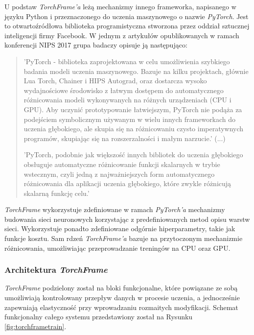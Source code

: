     U podstaw \textit{TorchFrame'a} leżą mechanizmy innego frameworka, napisanego w języku Python i
    przeznaczonego do uczenia maszynowego o nazwie \textit{PyTorch}. Jest to otwartoźródłowa
    biblioteka programistyczna stworzona przez oddział sztucznej inteligencji firmy
    Facebook. W jednym z artykułów \cite{pytorch} opublikowanych w ramach konferencji NIPS 2017
    grupa badaczy opisuje ją następująco:

    \begin{quote}
      'PyTorch - biblioteka zaprojektowana w celu umożliwienia szybkiego badania
      modeli uczenia maszynowego. Bazuje na kilku projektach, głównie Lua Torch,
      Chainer i HIPS Autograd, oraz dostarcza wysoko wydajnościowe środowisko z
      łatwym dostępem do automatycznego różnicowania modeli wykonywanych na różnych
      urządzeniach (CPU i GPU). Aby uczynić prototypowanie łatwiejszym, PyTorch
      nie podąża za podejściem symbolicznym używanym w wielu innych frameworkach
      do uczenia głębokiego, ale skupia się na różnicowaniu czysto imperatywnych
      programów, skupiając się na rozszerzalności i małym narzucie.' (...)

      'PyTorch, podobnie jak większość innych bibliotek do uczenia głębokiego obsługuje
      automatyczne różnicowanie funkcji skalarnych w trybie wstecznym, czyli jedną z najważniejszych form
      automatycznego różnicowania dla aplikacji uczenia głębokiego, które zwykle
      różnicują skalarną funkcję celu.'
    \end{quote}

    \textit{TorchFrame} wykorzystuje zdefiniowane w ramach \textit{PyTorch'a} mechanizmy budowania sieci neuronowych
    korzystając z predefiniowanych metod opisu warstw sieci. Wykorzystuje ponadto
    zdefiniowane odgórnie hiperparametry, takie jak funkcje kosztu. Sam rdzeń \textit{TorchFrame'a}
    bazuje na przytoczonym mechanizmie różnicowania, umożliwiając przeprowadzanie treningów
    na CPU oraz GPU.

  \subsubsection{Architektura \textit{TorchFrame}}

    \textit{TorchFrame} podzielony został na bloki funkcjonalne, które powiązane ze sobą
    umożliwiają kontrolowany przepływ danych w procesie uczenia, a jednocześnie
    zapewniają elastyczność przy wprowadzaniu rozmaitych modyfikacji. Schemat funkcjonalny
    całego systemu przedstawiony został na Rysunku \ref{fig:torchframetrain}.

